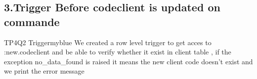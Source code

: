\newpage
\subsection*{3.Trigger Before codeclient is updated on commande}


\begin{prettyBox}{TP4Q2 Trigger}{myblue}
We created a row level trigger to get acces to :new.codeclient and be able to verify whether it exist in client table , if the exception no\_data\_found is raised it means the new client code doesn't exist and we print the error message  
\end{prettyBox}
